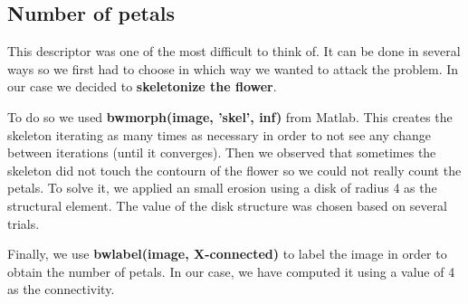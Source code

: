 \documentclass[11]{article}
\begin{document}
\subsection{Number of petals}

This descriptor was one of the most difficult to think of. It can be done in several ways so we first had to choose in which way we wanted to attack the problem. In our case we decided to \textbf{skeletonize the flower}.
\medskip

To do so we used \textbf{bwmorph(image, 'skel', inf)} from Matlab. This	 creates the skeleton iterating as many times as necessary in order to not see any change between iterations (until it converges). Then we observed that sometimes the skeleton did not touch the contourn of the flower so we could not really count the petals. To solve it, we applied an small erosion using a disk of radius 4 as the structural element. The value of the disk structure was chosen based on several trials.

Finally, we use \textbf{bwlabel(image, X-connected)} to label the image in order to obtain the number of petals. In our case, we have computed it using a value of 4 as the connectivity.

\medskip
\end{document}
